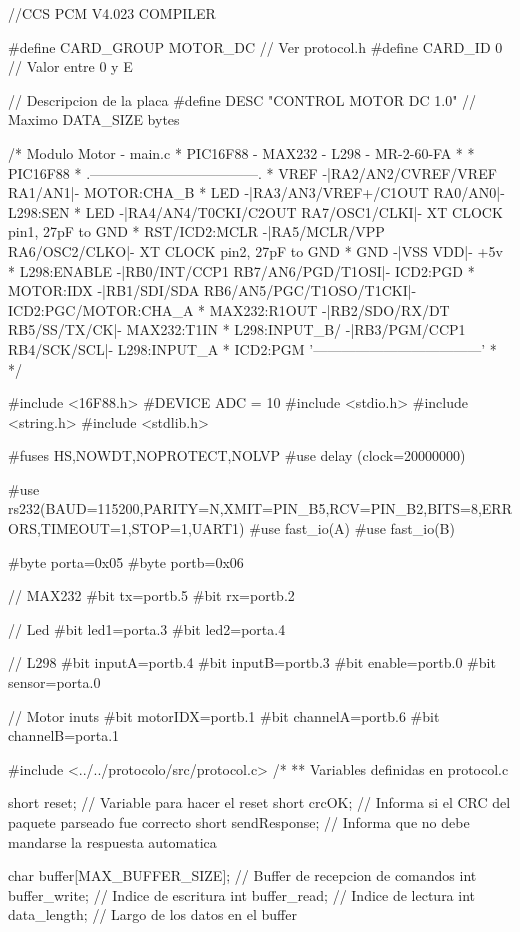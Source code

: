 {\scriptsize
\begin{verbatimtab}
//CCS PCM V4.023 COMPILER

#define CARD_GROUP	MOTOR_DC	// Ver protocol.h
#define CARD_ID		0		// Valor entre 0 y E

// Descripcion de la placa
#define DESC		"CONTROL MOTOR DC 1.0" // Maximo DATA_SIZE bytes

/* Modulo Motor - main.c
 * PIC16F88 - MAX232 - L298 - MR-2-60-FA
 *
 *                               PIC16F88
 *                .------------------------------------.
 *          VREF -|RA2/AN2/CVREF/VREF           RA1/AN1|- MOTOR:CHA_B
 *           LED -|RA3/AN3/VREF+/C1OUT          RA0/AN0|- L298:SEN
 *           LED -|RA4/AN4/T0CKI/C2OUT    RA7/OSC1/CLKI|- XT CLOCK pin1, 27pF to GND
 * RST/ICD2:MCLR -|RA5/MCLR/VPP           RA6/OSC2/CLKO|- XT CLOCK pin2, 27pF to GND
 *           GND -|VSS                              VDD|- +5v
 *   L298:ENABLE -|RB0/INT/CCP1       RB7/AN6/PGD/T1OSI|- ICD2:PGD
 *     MOTOR:IDX -|RB1/SDI/SDA  RB6/AN5/PGC/T1OSO/T1CKI|- ICD2:PGC/MOTOR:CHA_A
 *  MAX232:R1OUT -|RB2/SDO/RX/DT           RB5/SS/TX/CK|- MAX232:T1IN
 * L298:INPUT_B/ -|RB3/PGM/CCP1             RB4/SCK/SCL|- L298:INPUT_A
 *     ICD2:PGM   '------------------------------------'
 *    
 */

#include <16F88.h>
#DEVICE ADC = 10
#include <stdio.h>
#include <string.h>
#include <stdlib.h>

#fuses HS,NOWDT,NOPROTECT,NOLVP
#use delay (clock=20000000)

#use rs232(BAUD=115200,PARITY=N,XMIT=PIN_B5,RCV=PIN_B2,BITS=8,ERRORS,TIMEOUT=1,STOP=1,UART1)
#use fast_io(A)
#use fast_io(B)

#byte porta=0x05
#byte portb=0x06

// MAX232
#bit tx=portb.5
#bit rx=portb.2

// Led
#bit led1=porta.3
#bit led2=porta.4

// L298
#bit inputA=portb.4
#bit inputB=portb.3
#bit enable=portb.0
#bit sensor=porta.0

// Motor inuts
#bit motorIDX=portb.1
#bit channelA=portb.6
#bit channelB=porta.1

#include <../../protocolo/src/protocol.c>
/*
** Variables definidas en protocol.c

short reset; // Variable para hacer el reset
short crcOK; // Informa si el CRC del paquete parseado fue correcto
short sendResponse; // Informa que no debe mandarse la respuesta automatica

char buffer[MAX_BUFFER_SIZE];	// Buffer de recepcion de comandos
int buffer_write;				// Indice de escritura
int buffer_read;				// Indice de lectura
int data_length;				// Largo de los datos en el buffer


\end{verbatimtab}}
